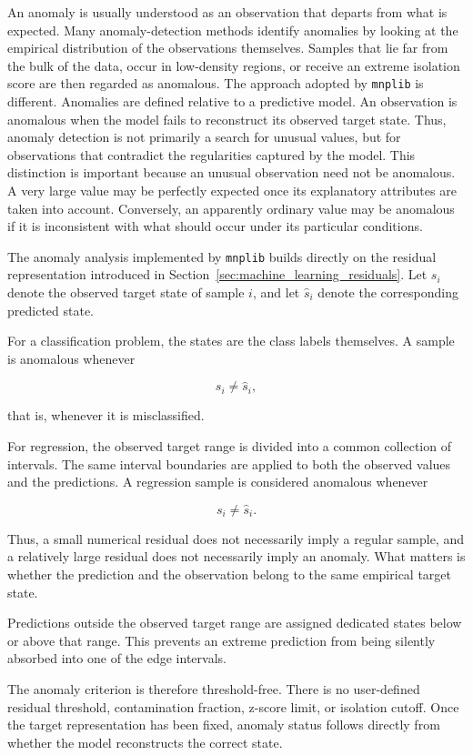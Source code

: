 An anomaly is usually understood as an observation that departs from what is expected. Many anomaly-detection methods identify anomalies by looking at the empirical distribution of the observations themselves. Samples that lie far from the bulk of the data, occur in low-density regions, or receive an extreme isolation score are then regarded as anomalous. The approach adopted by \texttt{mnplib} is different. Anomalies are defined relative to a predictive model. An observation is anomalous when the model fails to reconstruct its observed target state. Thus, anomaly detection is not primarily a search for unusual values, but for observations that contradict the regularities captured by the model. This distinction is important because an unusual observation need not be anomalous. A very large value may be perfectly expected once its explanatory attributes are taken into account. Conversely, an apparently ordinary value may be anomalous if it is inconsistent with what should occur under its particular conditions.

The anomaly analysis implemented by \texttt{mnplib} builds directly on the
residual representation introduced in
Section~\ref{sec:machine_learning_residuals}. Let \(s_i\) denote the observed
target state of sample \(i\), and let \(\widehat s_i\) denote the corresponding
predicted state.

For a classification problem, the states are the class labels themselves. A
sample is anomalous whenever

\[
s_i \neq \widehat s_i,
\]

that is, whenever it is misclassified.

For regression, the observed target range is divided into a common collection
of intervals. The same interval boundaries are applied to both the observed
values and the predictions. A regression sample is considered anomalous whenever

\[
s_i \neq \widehat s_i.
\]

Thus, a small numerical residual does not necessarily imply a regular sample,
and a relatively large residual does not necessarily imply an anomaly. What
matters is whether the prediction and the observation belong to the same
empirical target state.

Predictions outside the observed target range are assigned dedicated states
below or above that range. This prevents an extreme prediction from being
silently absorbed into one of the edge intervals.

The anomaly criterion is therefore threshold-free. There is no user-defined
residual threshold, contamination fraction, z-score limit, or isolation cutoff.
Once the target representation has been fixed, anomaly status follows directly
from whether the model reconstructs the correct state.

